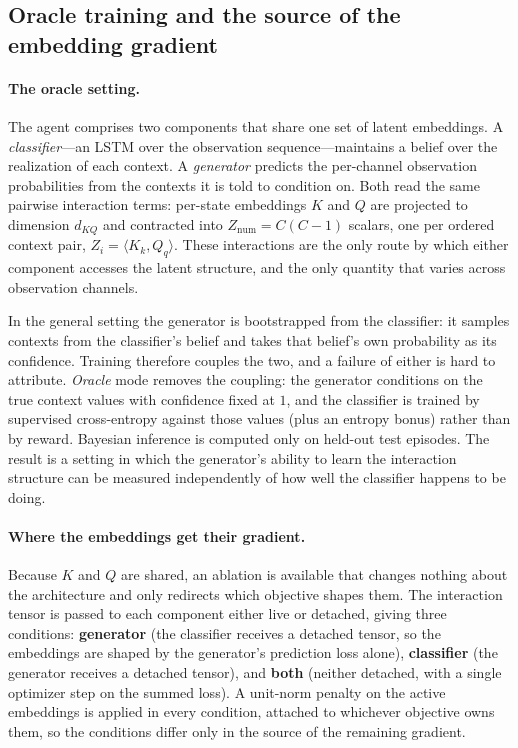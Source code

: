 \subsection{Oracle training and the source of the embedding gradient}
\label{sec:oracle-ablation}

\paragraph{The oracle setting.}
The agent comprises two components that share one set of latent embeddings.
A \emph{classifier}---an LSTM over the observation sequence---maintains a belief
over the realization of each context. A \emph{generator} predicts the per-channel
observation probabilities from the contexts it is told to condition on. Both read
the same pairwise interaction terms: per-state embeddings $K$ and $Q$ are projected
to dimension $d_{KQ}$ and contracted into $Z_{\text{num}} = C(C-1)$ scalars, one per
ordered context pair, $Z_i = \langle K_k, Q_q \rangle$. These interactions are the
only route by which either component accesses the latent structure, and the only
quantity that varies across observation channels.

In the general setting the generator is bootstrapped from the classifier: it samples
contexts from the classifier's belief and takes that belief's own probability as its
confidence. Training therefore couples the two, and a failure of either is hard to
attribute. \emph{Oracle} mode removes the coupling: the generator conditions on the
true context values with confidence fixed at $1$, and the classifier is trained by
supervised cross-entropy against those values (plus an entropy bonus) rather than by
reward. Bayesian inference is computed only on held-out test episodes. The result is
a setting in which the generator's ability to learn the interaction structure can be
measured independently of how well the classifier happens to be doing.

\paragraph{Where the embeddings get their gradient.}
Because $K$ and $Q$ are shared, an ablation is available that changes nothing about
the architecture and only redirects which objective shapes them. The interaction
tensor is passed to each component either live or detached, giving three conditions:
\textbf{generator} (the classifier receives a detached tensor, so the embeddings are
shaped by the generator's prediction loss alone), \textbf{classifier} (the generator
receives a detached tensor), and \textbf{both} (neither detached, with a single
optimizer step on the summed loss). A unit-norm penalty on the active embeddings is
applied in every condition, attached to whichever objective owns them, so the
conditions differ only in the source of the remaining gradient.

